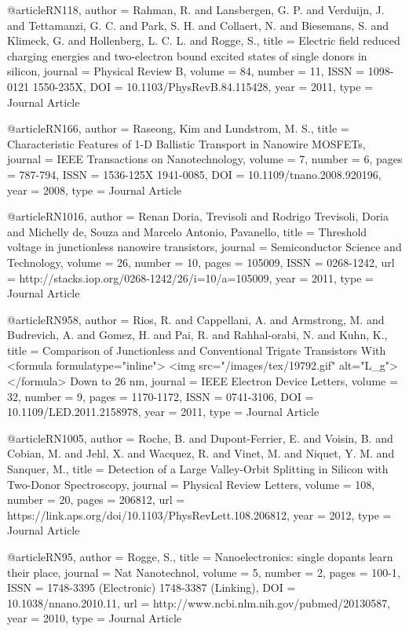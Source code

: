 @article{RN118,
   author = {Rahman, R. and Lansbergen, G. P. and Verduijn, J. and Tettamanzi, G. C. and Park, S. H. and Collaert, N. and Biesemans, S. and Klimeck, G. and Hollenberg, L. C. L. and Rogge, S.},
   title = {Electric field reduced charging energies and two-electron bound excited states of single donors in silicon},
   journal = {Physical Review B},
   volume = {84},
   number = {11},
   ISSN = {1098-0121
1550-235X},
   DOI = {10.1103/PhysRevB.84.115428},
   year = {2011},
   type = {Journal Article}
}

@article{RN166,
   author = {Raseong, Kim and Lundstrom, M. S.},
   title = {Characteristic Features of 1-D Ballistic Transport in Nanowire MOSFETs},
   journal = {IEEE Transactions on Nanotechnology},
   volume = {7},
   number = {6},
   pages = {787-794},
   ISSN = {1536-125X
1941-0085},
   DOI = {10.1109/tnano.2008.920196},
   year = {2008},
   type = {Journal Article}
}

@article{RN1016,
   author = {Renan Doria, Trevisoli and Rodrigo Trevisoli, Doria and Michelly de, Souza and Marcelo Antonio, Pavanello},
   title = {Threshold voltage in junctionless nanowire transistors},
   journal = {Semiconductor Science and Technology},
   volume = {26},
   number = {10},
   pages = {105009},
   ISSN = {0268-1242},
   url = {http://stacks.iop.org/0268-1242/26/i=10/a=105009},
   year = {2011},
   type = {Journal Article}
}

@article{RN958,
   author = {Rios, R. and Cappellani, A. and Armstrong, M. and Budrevich, A. and Gomez, H. and Pai, R. and Rahhal-orabi, N. and Kuhn, K.},
   title = {Comparison of Junctionless and Conventional Trigate Transistors With <formula formulatype="inline"> <img src="/images/tex/19792.gif" alt="L_{g}"> </formula> Down to 26 nm},
   journal = {IEEE Electron Device Letters},
   volume = {32},
   number = {9},
   pages = {1170-1172},
   ISSN = {0741-3106},
   DOI = {10.1109/LED.2011.2158978},
   year = {2011},
   type = {Journal Article}
}

@article{RN1005,
   author = {Roche, B. and Dupont-Ferrier, E. and Voisin, B. and Cobian, M. and Jehl, X. and Wacquez, R. and Vinet, M. and Niquet, Y. M. and Sanquer, M.},
   title = {Detection of a Large Valley-Orbit Splitting in Silicon with Two-Donor Spectroscopy},
   journal = {Physical Review Letters},
   volume = {108},
   number = {20},
   pages = {206812},
   url = {https://link.aps.org/doi/10.1103/PhysRevLett.108.206812},
   year = {2012},
   type = {Journal Article}
}

@article{RN95,
   author = {Rogge, S.},
   title = {Nanoelectronics: single dopants learn their place},
   journal = {Nat Nanotechnol},
   volume = {5},
   number = {2},
   pages = {100-1},
   ISSN = {1748-3395 (Electronic)
1748-3387 (Linking)},
   DOI = {10.1038/nnano.2010.11},
   url = {http://www.ncbi.nlm.nih.gov/pubmed/20130587},
   year = {2010},
   type = {Journal Article}
}

